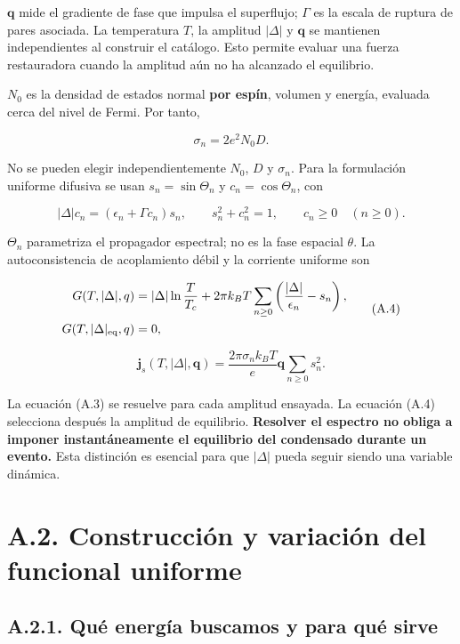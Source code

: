 \documentclass[
  spanish,
  10pt,
  a4paper,
]{article}
\begin{document}
\(\mathbf q\) mide el gradiente de fase que impulsa el superflujo;
\(\Gamma\) es la escala de ruptura de pares asociada. La temperatura
\(T\), la amplitud \(|\Delta|\) y \(\mathbf q\) se mantienen
independientes al construir el catálogo. Esto permite evaluar una fuerza
restauradora cuando la amplitud aún no ha alcanzado el equilibrio.

\(N_0\) es la densidad de estados normal \textbf{por espín}, volumen y
energía, evaluada cerca del nivel de Fermi. Por tanto,

\[
\sigma_n=2e^2N_0D.
\tag{A.2}
\]

No se pueden elegir independientemente \(N_0\), \(D\) y \(\sigma_n\).
Para la formulación uniforme difusiva se usan \(s_n=\sin\Theta_n\) y
\(c_n=\cos\Theta_n\), con

\[
|\Delta|c_n=(\epsilon_n+\Gamma c_n)s_n,
\qquad s_n^2+c_n^2=1,\qquad c_n\geq0\quad(n\geq0).
\tag{A.3}
\]

\(\Theta_n\) parametriza el propagador espectral; no es la fase espacial
\(\theta\). La autoconsistencia de acoplamiento débil y la corriente
uniforme son

\[
\begin{aligned}
G(T,|\Delta|,q)&=|\Delta|\ln\frac{T}{T_c}
+2\pi k_BT\sum_{n\geq0}\left(\frac{|\Delta|}{\epsilon_n}-s_n\right),\\
G(T,|\Delta|_{\rm eq},q)&=0,
\end{aligned}
\tag{A.4}
\]

\[
\mathbf j_s(T,|\Delta|,\mathbf q)
=\frac{2\pi\sigma_n k_BT}{e}\mathbf q\sum_{n\geq0}s_n^2.
\tag{A.5}
\]

La ecuación (A.3) se resuelve para cada amplitud ensayada. La ecuación
(A.4) selecciona después la amplitud de equilibrio. \textbf{Resolver el
espectro no obliga a imponer instantáneamente el equilibrio del
condensado durante un evento.} Esta distinción es esencial para que
\(|\Delta|\) pueda seguir siendo una variable dinámica.

\newpage

\section{A.2. Construcción y variación del funcional
uniforme}\label{a.2.-construcciuxf3n-y-variaciuxf3n-del-funcional-uniforme}

\subsection{A.2.1. Qué energía buscamos y para qué
sirve}\label{a.2.1.-quuxe9-energuxeda-buscamos-y-para-quuxe9-sirve}
\end{document}
